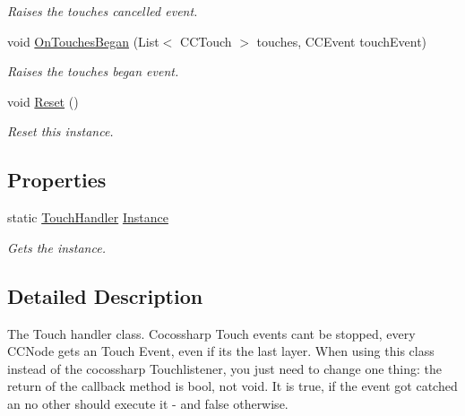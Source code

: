 \begin{DoxyCompactItemize}
\begin{DoxyCompactList}\small\item\em Raises the touches cancelled event. \end{DoxyCompactList}\item 
void \hyperlink{classClient_1_1Common_1_1Views_1_1TouchHandler_ac21679b308098e955aecb76562481078}{On\+Touches\+Began} (List$<$ C\+C\+Touch $>$ touches, C\+C\+Event touch\+Event)
\begin{DoxyCompactList}\small\item\em Raises the touches began event. \end{DoxyCompactList}\item 
void \hyperlink{classClient_1_1Common_1_1Views_1_1TouchHandler_a2e0e9566cfdd4ce64d05d681420291c8}{Reset} ()
\begin{DoxyCompactList}\small\item\em Reset this instance. \end{DoxyCompactList}\end{DoxyCompactItemize}
\subsection*{Properties}
\begin{DoxyCompactItemize}
\item 
static \hyperlink{classClient_1_1Common_1_1Views_1_1TouchHandler}{Touch\+Handler} \hyperlink{classClient_1_1Common_1_1Views_1_1TouchHandler_a7e254f6b907749393dd3f65a38f5bec1}{Instance}
\begin{DoxyCompactList}\small\item\em Gets the instance. \end{DoxyCompactList}\end{DoxyCompactItemize}


\subsection{Detailed Description}
The Touch handler class. Cocossharp Touch events can\textquotesingle{}t be stopped, every C\+C\+Node gets an Touch Event, even if it\textquotesingle{}s the last layer. When using this class instead of the cocossharp Touchlistener, you just need to change one thing\+: the return of the callback method is bool, not void. It is true, if the event got catched an no other should execute it -\/ and false otherwise. 



